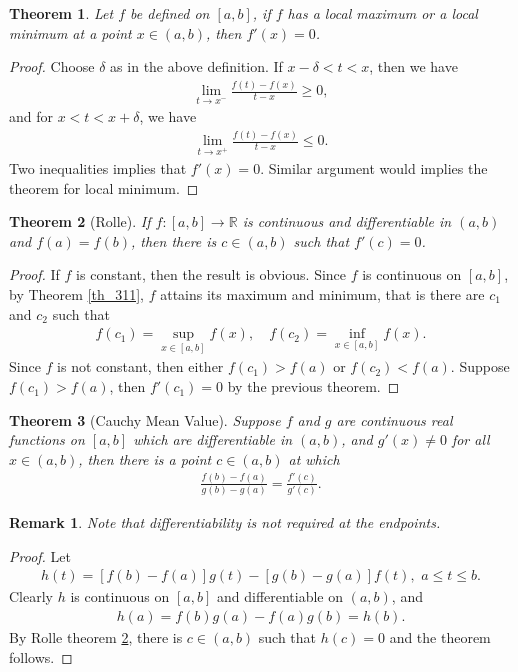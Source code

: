 \documentclass[10pt]{book}
\newtheorem{theorem}{Theorem}[chapter]
\newtheorem{remark}{Remark}[chapter]
\theoremstyle{definition}
\numberwithin{equation}{chapter}
\begin{document}
\begin{theorem}\label{th_45}
Let $f$ be defined on $[a,b]$, if $f$ has a local maximum or a local minimum at a point $x \in (a,b)$, then $f'(x) = 0$.
\end{theorem}
\begin{proof}
Choose $\delta$ as in the above definition. If $x - \delta < t < x$, then we have
\begin{align*}
    \lim_{t\to x^-}\frac{f(t) - f(x)}{t - x} \geq 0,
\end{align*}
and for $x < t < x + \delta$, we have
\begin{align*}
    \lim_{t\to x^+}\frac{f(t) - f(x)}{t - x} \leq 0.
\end{align*}
Two inequalities implies that $f'(x) = 0$. Similar argument would implies the theorem for local minimum.
\end{proof}

\medskip

\begin{theorem}[Rolle]\label{th_46}
If $f: [a,b] \to \mathbb{R}$ is continuous and differentiable in $(a,b)$ and $f(a) = f(b)$, then there is $c \in (a,b)$ such that $f'(c) = 0$.
\end{theorem}
\begin{proof}
If $f$ is constant, then the result is obvious. Since $f$ is continuous on $[a,b]$, by Theorem \ref{th_311}, $f$ attains its maximum and minimum, that is there are $c_1$ and $c_2$ such that
\begin{align*}
    f(c_1) = \sup_{x\in[a,b]} f(x), \quad f(c_2) = \inf_{x\in[a,b]} f(x).
\end{align*}
Since $f$ is not constant, then either $f(c_1) > f(a)$ or $f(c_2) < f(a)$. Suppose $f(c_1) > f(a)$, then $f'(c_1) = 0$ by the previous theorem.
\end{proof}

\medskip

\begin{theorem}[Cauchy Mean Value]\label{th_47}
Suppose $f$ and $g$ are continuous real functions on $[a,b]$ which are differentiable in $(a,b)$, and $g'(x) \neq 0$ for all $x \in (a,b)$, then there is a point $c \in (a,b)$ at which 
\begin{align*}
    \frac{f(b) - f(a)}{g(b) - g(a)} = \frac{f'(c)}{g'(c)}.
\end{align*}
\end{theorem}
\begin{remark}
Note that differentiability is not required at the endpoints.
\end{remark}
\begin{proof}
Let
\begin{align*}
    h(t) = [f(b) - f(a)]g(t) - [g(b) - g(a)]f(t), \,\, a \leq t \leq b.
\end{align*}
Clearly $h$ is continuous on $[a,b]$ and differentiable on $(a,b)$, and
\begin{align*}
    h(a) = f(b)g(a) - f(a)g(b) = h(b).
\end{align*}
By Rolle theorem \ref{th_46}, there is $c \in (a,b)$ such that $h(c) = 0$ and the theorem follows.
\end{proof}
\end{document}

